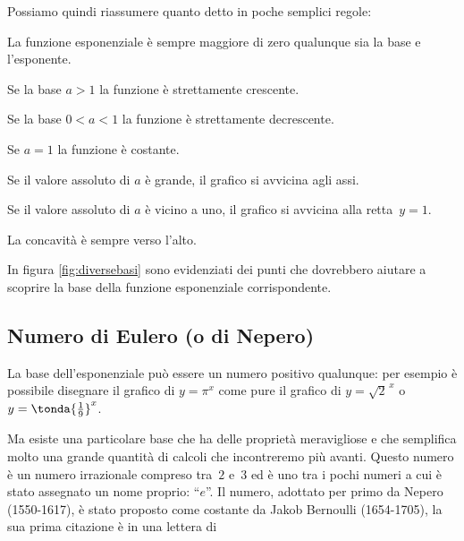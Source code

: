 
Possiamo quindi riassumere quanto detto in poche semplici regole: 
\begin{enumerate*}
 \item La funzione esponenziale è sempre maggiore di zero qualunque sia la 
base e l'esponente.
 \item Se la base \(a>1\) la funzione è strettamente crescente.
 \item Se la base \(0<a<1\) la funzione è strettamente decrescente.
 \item Se \(a=1\) la funzione è costante.
 \item Se il valore assoluto di \(a\) è grande, il grafico si avvicina agli 
assi.
 \item Se il valore assoluto di \(a\) è vicino a uno, il grafico si 
avvicina alla 
retta~\(y=1\).
 \item La concavità è sempre verso l'alto.
\end{enumerate*}

In figura \ref{fig:diversebasi} sono evidenziati dei punti che dovrebbero 
aiutare a scoprire la base della funzione esponenziale corrispondente.

\subsection{Numero di Eulero (o di Nepero)}
\label{subsec:esplog_eulero}

\noindent\begin{minipage}{.48\textwidth}
La base dell'esponenziale può essere un numero positivo qualunque: per 
esempio è possibile disegnare il grafico di \(y=\pi^x\)
come pure il grafico di \(y = \sqrt{2}^{\,x}\) o 
\(y = \tonda{\frac{1}{9}}^{x}\). 

Ma esiste una particolare base che ha delle proprietà meravigliose e che 
semplifica molto una grande quantità di calcoli che incontreremo più avanti.
Questo numero è un numero irrazionale compreso tra~\(2\) e~\(3\) ed è uno 
tra i pochi numeri a cui è stato assegnato un nome proprio: ``\(e\)''.
Il numero, adottato per primo da Nepero (1550-1617), è stato proposto come 
costante da Jakob Bernoulli (1654-1705), la sua prima citazione è in una 
lettera di
\end{minipage}
\hfill
\begin{minipage}{.48\textwidth}
\begin{center} \altrebasi \end{center}
\end{minipage}


